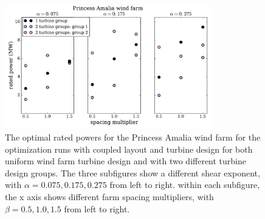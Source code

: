 \begin{figure}[htbp]
  \centering
  \includegraphics[width=0.8\textwidth]{Figures/amaliaPowers.pdf}
  \caption{\label{amalia_power} The optimal rated powers for the Princess Amalia wind farm for the optimization runs with coupled layout and turbine design for both uniform wind farm turbine design and with two different turbine design groups. The three subfigures show a different shear exponent, with $\alpha=0.075,0.175,0.275$ from left to right. within each subfigure, the x axis shows different farm spacing multipliers, with $\beta=0.5,1.0,1.5$ from left to right.}
\end{figure}




